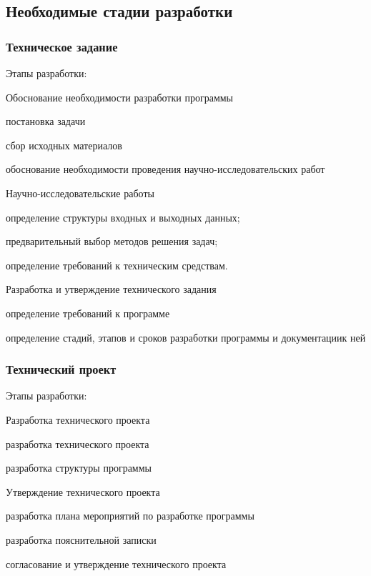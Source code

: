 
\subsection{Необходимые стадии разработки}
\subsubsection{Техническое задание}
Этапы разработки:
\begin{my_enumerate}
	\item Обоснование необходимости разработки программы
		\begin{my_enumerate}
			\item постановка задачи
			\item сбор исходных материалов
			\item обоснование необходимости проведения научно-исследовательских работ
		\end{my_enumerate}
	\item Научно-исследовательские работы
		\begin{my_enumerate}
			\item определение структуры входных и выходных данных;
			\item предварительный выбор методов решения задач;
			\item определение требований к техническим средствам.
		\end{my_enumerate}
	\item Разработка и утверждение технического задания
		\begin{my_enumerate}
			\item определение требований к программе
			\item определение стадий, этапов и сроков разработки программы и документациик ней
		\end{my_enumerate}
\end{my_enumerate}


\subsubsection{Технический проект}
Этапы разработки:
\begin{my_enumerate}
	\item Разработка технического проекта
	\begin{my_enumerate}
		\item разработка технического проекта
		\item разработка структуры программы
	\end{my_enumerate}
	\item Утверждение технического проекта
	\begin{my_enumerate}
		\item разработка плана мероприятий по разработке программы
		\item разработка пояснительной записки
		\item согласование и утверждение технического проекта
	\end{my_enumerate}
\end{my_enumerate}


